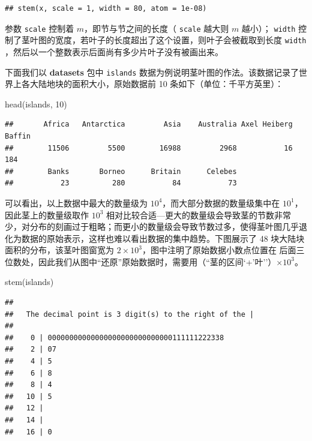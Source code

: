 \documentclass[
  b5paper,
  UTF8,twoside]{book}
\newenvironment{Shaded}{\begin{snugshade}}{\end{snugshade}}
\newcommand{\DecValTok}[1]{\textcolor[rgb]{0.00,0.00,0.81}{#1}}
\newcommand{\FunctionTok}[1]{\textcolor[rgb]{0.00,0.00,0.00}{#1}}
\newcommand{\NormalTok}[1]{#1}
\begin{document}
\begin{verbatim}
## stem(x, scale = 1, width = 80, atom = 1e-08)
\end{verbatim}

参数 \texttt{scale} 控制着 \(m\)，即节与节之间的长度（ \texttt{scale} 越大则 \(m\) 越小）； \texttt{width} 控制了茎叶图的宽度，若叶子的长度超出了这个设置，则叶子会被截取到长度 \texttt{width} ，然后以一个整数表示后面尚有多少片叶子没有被画出来。

下面我们以 \textbf{datasets} 包中 \texttt{islands} 数据为例说明茎叶图的作法。该数据记录了世界上各大陆地块的面积大小，原始数据前 10 条如下（单位：千平方英里）：

\begin{Shaded}
\begin{Highlighting}[]
\FunctionTok{head}\NormalTok{(islands, }\DecValTok{10}\NormalTok{)}
\end{Highlighting}
\end{Shaded}

\begin{verbatim}
##       Africa   Antarctica         Asia    Australia Axel Heiberg       Baffin 
##        11506         5500        16988         2968           16          184 
##        Banks       Borneo      Britain      Celebes 
##           23          280           84           73
\end{verbatim}

可以看出，以上数据中最大的数量级为 \(10^{4}\)，而大部分数据的数量级集中在 \(10^{1}\)，因此茎上的数量级取作 \(10^{3}\) 相对比较合适---更大的数量级会导致茎的节数非常少，对分布的刻画过于粗略；而更小的数量级会导致节数过多，使得茎叶图几乎退化为数据的原始表示，这样也难以看出数据的集中趋势。下图展示了 48 块大陆块面积的分布，该茎叶图窗宽为 \(2\times10^{3}\)，图中注明了原始数据小数点位置在 \texttt{\textbar{}} 后面三位数处，因此我们从图中``还原''原始数据时，需要用（``茎的区间`+'叶''）\(\times10^{3}\)。

\begin{Shaded}
\begin{Highlighting}[]
\FunctionTok{stem}\NormalTok{(islands)}
\end{Highlighting}
\end{Shaded}

\begin{verbatim}
## 
##   The decimal point is 3 digit(s) to the right of the |
## 
##    0 | 00000000000000000000000000000111111222338
##    2 | 07
##    4 | 5
##    6 | 8
##    8 | 4
##   10 | 5
##   12 | 
##   14 | 
##   16 | 0
\end{verbatim}
\end{document}
